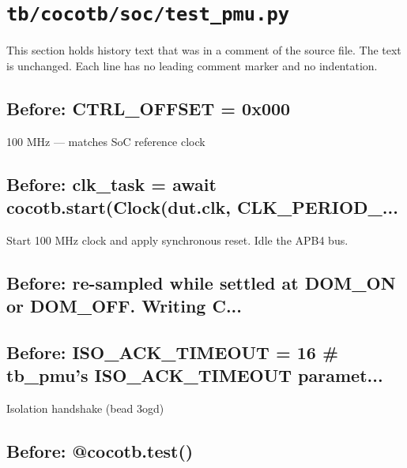 \section{\texttt{tb/cocotb/soc/test\_pmu.py}}\label{cr:suite:soc-test-pmu}

This section holds history text that was in a comment of the source file. The text is unchanged. Each line has no leading comment marker and no indentation.

\begin{record}

\subsection*{Before: CTRL\_OFFSET      = 0x000}

\begin{textblock}
100 MHz — matches SoC reference clock
\end{textblock}

\subsection*{Before: clk\_task = await cocotb.start(Clock(dut.clk, CLK\_PERIOD\_...}

\begin{textblock}
Start 100 MHz clock and apply synchronous reset. Idle the APB4 bus.
\end{textblock}

\subsection*{Before: re-sampled while settled at DOM\_ON or DOM\_OFF. Writing C...}


\subsection*{Before: ISO\_ACK\_TIMEOUT = 16  \# tb\_pmu's ISO\_ACK\_TIMEOUT paramet...}

\begin{textblock}
Isolation handshake (bead 3ogd)
\end{textblock}

\subsection*{Before: @cocotb.test()}


\end{record}

